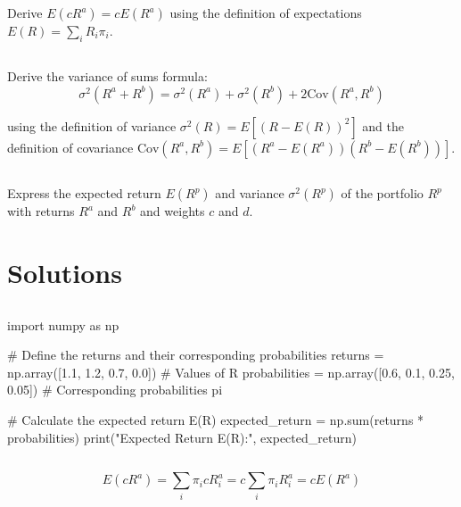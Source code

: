 Derive $E(cR^a) = cE(R^a)$ using the 
definition of expectations $E(R) = \sum_i R_i \pi_i$.

\subsection{}

Derive the variance of sums formula:
\begin{equation}
    \sigma^2(R^a + R^b) = \sigma^2(R^a) + \sigma^2(R^b) + 2\text{Cov}(R^a, R^b)
\end{equation}

using the definition of variance $\sigma^2(R) = E[(R - E(R))^2]$ and
the definition of covariance $\text{Cov}(R^a, R^b) = E[(R^a - E(R^a))(R^b - E(R^b))]$.



\subsection{}

Express the expected return $E(R^p)$ 
and variance $\sigma^2(R^p)$ of the
portfolio $R^p$ with returns $R^a$ and $R^b$
and weights $c$ and $d$.

\newpage
\section{Solutions}

\subsection{}

\begin{python}
import numpy as np

# Define the returns and their corresponding probabilities
returns = np.array([1.1, 1.2, 0.7, 0.0])  # Values of R
probabilities = np.array([0.6, 0.1, 0.25, 0.05])  # Corresponding probabilities pi

# Calculate the expected return E(R)
expected_return = np.sum(returns * probabilities)
print("Expected Return E(R):", expected_return)
\end{python}


\subsection{}

\begin{equation}
    E(cR^a) = \sum_i \pi_i c R^a_i  = c\sum_i  \pi_i R^a_i = cE(R^a)
\end{equation}

